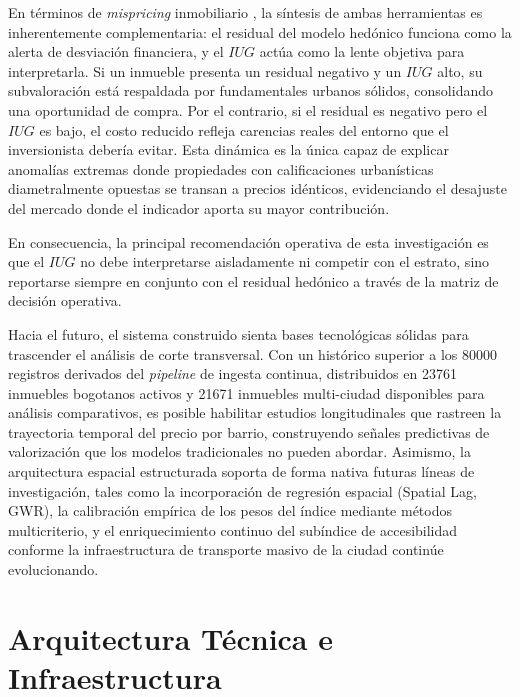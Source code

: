 \documentclass[12pt, a4paper, twoside, openright]{report}
\theoremstyle{plain}
\theoremstyle{definition}
\newcommand{\IUG}{IUG}             %
\begin{document}
En términos de \emph{mispricing} inmobiliario \citep{shiller2015}, la síntesis de ambas herramientas es inherentemente complementaria: el residual del modelo hedónico funciona como la alerta de desviación financiera, y el $\IUG$ actúa como la lente objetiva para interpretarla. Si un inmueble presenta un residual negativo y un $\IUG$ alto, su subvaloración está respaldada por fundamentales urbanos sólidos, consolidando una oportunidad de compra. Por el contrario, si el residual es negativo pero el $\IUG$ es bajo, el costo reducido refleja carencias reales del entorno que el inversionista debería evitar. Esta dinámica es la única capaz de explicar anomalías extremas donde propiedades con calificaciones urbanísticas diametralmente opuestas se transan a precios idénticos, evidenciando el desajuste del mercado donde el indicador aporta su mayor contribución.

En consecuencia, la principal recomendación operativa de esta investigación es que el $\IUG$ no debe interpretarse aisladamente ni competir con el estrato, sino reportarse siempre en conjunto con el residual hedónico a través de la matriz de decisión operativa. 

Hacia el futuro, el sistema construido sienta bases tecnológicas sólidas para trascender el análisis de corte transversal. Con un histórico superior a los \num{80000} registros derivados del \emph{pipeline} de ingesta continua, distribuidos en \num{23761} inmuebles bogotanos activos y \num{21671} inmuebles multi-ciudad disponibles para análisis comparativos, es posible habilitar estudios longitudinales que rastreen la trayectoria temporal del precio por barrio, construyendo señales predictivas de valorización que los modelos tradicionales no pueden abordar. Asimismo, la arquitectura espacial estructurada soporta de forma nativa futuras líneas de investigación, tales como la incorporación de regresión espacial (Spatial Lag, GWR), la calibración empírica de los pesos del índice mediante métodos multicriterio, y el enriquecimiento continuo del subíndice de accesibilidad conforme la infraestructura de transporte masivo de la ciudad continúe evolucionando.



\appendix

\chapter{Arquitectura Técnica e Infraestructura}\label{ax:tecnico}
\end{document}
